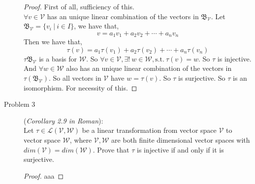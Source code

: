 \documentclass[a4paper]{article}
\begin{document}
\begin{description}
\begin{proof}
First of all, sufficiency of this.\\
$\forall v \in \mathcal{V}$ has an unique linear combination of the vectors in $\mathfrak{B}_{\mathcal{V}}$. Let $\mathfrak{B}_{\mathcal{V}}=\{v_{i}\  |\ i\in I \}$, we have that,
\begin{equation*}
  v=a_{1}v_{1}+a_{2}v_{2}+\cdots +a_{n}v_{n}
\end{equation*}
Then we have that,
\begin{equation*}
  \tau(v)=a_{1}\tau(v_{1})+a_{2}\tau(v_{2})+\cdots +a_{n}\tau(v_{n})
\end{equation*}
$\tau{\mathfrak{B}_{\mathcal{V}}}$ is a basis for $\mathcal{W}$. So $\forall v \in \mathcal{V}, \exists!\  w \in \mathcal{W}, \text{s.t.}\ \tau(v)=w$. So $\tau$ is injective.
And $\forall w \in \mathcal{W}$ also has an unique linear combination of the vectors in $\tau(\mathfrak{B}_{\mathcal{V}})$. So all vectors in $\mathcal{V}$ have $w=\tau(v)$. So $\tau$
is surjective. So $\tau$ is an isomorphism.
For necessity of this. 
\end{proof}

\item[Problem 3](\textit{Corollary 2.9 in Roman}):\\
Let $\tau \in \mathcal{L}(\mathcal{V},\mathcal{W})$ be a linear transformation from vector space $\mathcal{V}$ to vector space $\mathcal{W}$, where $\mathcal{V},\mathcal{W}$ are both finite dimensional vector spaces with $dim(\mathcal{V})=dim(\mathcal{W})$. Prove that $\tau$ is injective if and only if it is surjective.

\begin{proof}
aaa
\end{proof}

\end{description}
\end{document}
